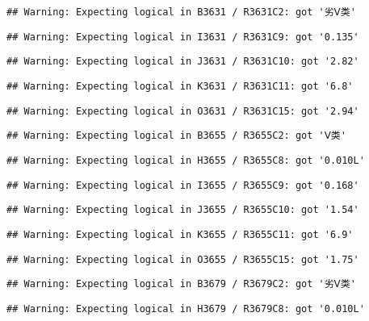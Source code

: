 \documentclass[
]{article}
\begin{document}
\begin{verbatim}
## Warning: Expecting logical in B3631 / R3631C2: got '劣Ⅴ类'
\end{verbatim}

\begin{verbatim}
## Warning: Expecting logical in I3631 / R3631C9: got '0.135'
\end{verbatim}

\begin{verbatim}
## Warning: Expecting logical in J3631 / R3631C10: got '2.82'
\end{verbatim}

\begin{verbatim}
## Warning: Expecting logical in K3631 / R3631C11: got '6.8'
\end{verbatim}

\begin{verbatim}
## Warning: Expecting logical in O3631 / R3631C15: got '2.94'
\end{verbatim}

\begin{verbatim}
## Warning: Expecting logical in B3655 / R3655C2: got 'Ⅴ类'
\end{verbatim}

\begin{verbatim}
## Warning: Expecting logical in H3655 / R3655C8: got '0.010L'
\end{verbatim}

\begin{verbatim}
## Warning: Expecting logical in I3655 / R3655C9: got '0.168'
\end{verbatim}

\begin{verbatim}
## Warning: Expecting logical in J3655 / R3655C10: got '1.54'
\end{verbatim}

\begin{verbatim}
## Warning: Expecting logical in K3655 / R3655C11: got '6.9'
\end{verbatim}

\begin{verbatim}
## Warning: Expecting logical in O3655 / R3655C15: got '1.75'
\end{verbatim}

\begin{verbatim}
## Warning: Expecting logical in B3679 / R3679C2: got '劣Ⅴ类'
\end{verbatim}

\begin{verbatim}
## Warning: Expecting logical in H3679 / R3679C8: got '0.010L'
\end{verbatim}
\end{document}
